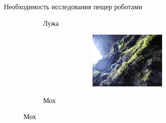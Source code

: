 \documentclass[aspectratio=169,xcolor=table]{beamer}
\begin{document}
\begin{frame}[t]{Необходимость исследования пещер роботами}
\begin{figure}[H]
\begin{subfigure}[b]{0.3\textwidth}
            \caption*{Лужа}
            \label{fig:surface_types/splash.png}
        \end{subfigure}
        \hfill
        \begin{subfigure}[b]{0.3\textwidth}
            \centering\includegraphics[height=2.8cm,width=1\textwidth,keepaspectratio]{surface_types/moss.jpg}\\
            \caption*{Мох}
            \label{fig:surface_types/moss}
        \end{subfigure}
    \end{figure}
\end{frame}
\end{document}

